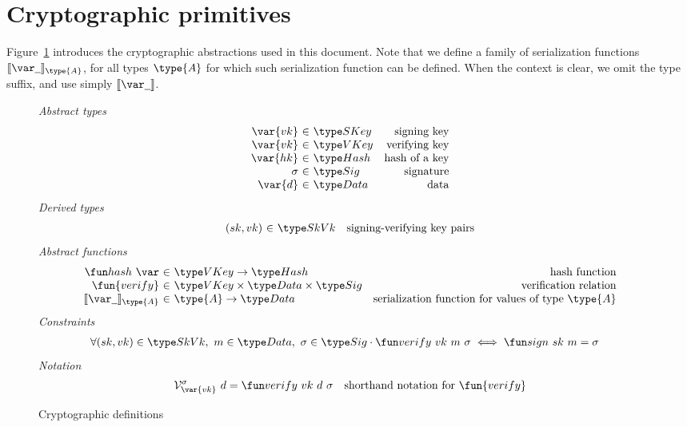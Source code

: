 \section{Cryptographic primitives}
\label{sec:crypto-primitives}

Figure~\ref{fig:crypto-defs} introduces the cryptographic abstractions used in
this document. Note that we define a family of serialization functions
$\serialised{\wcard}_\type{A}$, for all types $\type{A}$ for which such
serialization function can be defined. When the context is clear, we omit the
type suffix, and use simply $\serialised{\wcard}$.

\begin{figure}[htb]
  \emph{Abstract types}
  \begin{equation*}
    \begin{array}{r@{~\in~}lr}
      \var{vk} & \SKey & \text{signing key}\\
      \var{vk} & \VKey & \text{verifying key}\\
      \var{hk} & \Hash & \text{hash of a key}\\
      \sigma & \Sig  & \text{signature}\\
      \var{d} & \Data  & \text{data}\\
    \end{array}
  \end{equation*}
  \emph{Derived types}
  \begin{equation*}
    \begin{array}{r@{~\in~}lr}
      (sk, vk) & \SkVk & \text{signing-verifying key pairs}
    \end{array}
  \end{equation*}
  \emph{Abstract functions}
  \begin{equation*}
    \begin{array}{r@{~\in~}lr}
      \hash{} & \VKey \to \Hash
      & \text{hash function} \\
      \fun{verify} & \VKey \times \Data \times \Sig
      & \text{verification relation}\\
      \serialised{\wcard}_\type{A} & \type{A} \to \Data
      & \text{serialization function for values of type $\type{A}$}
    \end{array}
  \end{equation*}
  \emph{Constraints}
  \begin{align*}
    & \forall (sk, vk) \in \SkVk,~ m \in \Data,~ \sigma \in \Sig \cdot
      \verify{vk}{m}{\sigma} \iff \sign{sk}{m} = \sigma
  \end{align*}
  \emph{Notation}
  \begin{align*}
    & \mathcal{V}^\sigma_{\var{vk}}~{d} = \verify{vk}{d}{\sigma}
      & \text{shorthand notation for } \fun{verify}
  \end{align*}
  \caption{Cryptographic definitions}
  \label{fig:crypto-defs}
\end{figure}

